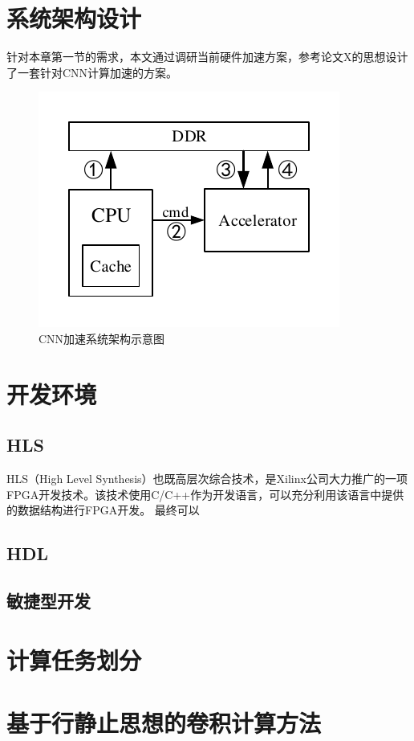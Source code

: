 \section{系统架构设计}
    针对本章第一节的需求，本文通过调研当前硬件加速方案，参考论文X的思想设计了一套针对CNN计算加速的方案。
    \begin{figure}[h]
        \centering
        \includegraphics{../pdf/system.pdf}
        \caption{CNN加速系统架构示意图}
        \label{}
    \end{figure}

\section{开发环境}
    \subsection{HLS}
    HLS（High Level Synthesis）也既高层次综合技术，是Xilinx公司大力推广的一项FPGA开发技术。该技术使用C/C++作为开发语言，可以充分利用该语言中提供的数据结构进行FPGA开发。
    最终可以
    \subsection{HDL}
    \subsection{敏捷型开发}

\section{计算任务划分}

\section{基于行静止思想的卷积计算方法}

